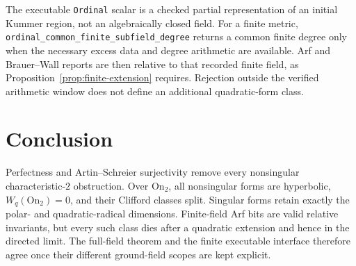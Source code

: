 \documentclass[11pt]{article}
\theoremstyle{definition}
\theoremstyle{remark}
\newcommand{\On}{\mathrm{On}_2}
\begin{document}
The executable \texttt{Ordinal} scalar is a checked partial representation of
an initial Kummer region, not an algebraically closed field.  For a finite
metric, \texttt{ordinal\_common\_finite\_subfield\_degree} returns a common
finite degree only when the necessary excess data and degree arithmetic are
available.  Arf and Brauer--Wall reports are then relative to that recorded
finite field, as Proposition~\ref{prop:finite-extension} requires.  Rejection
outside the verified arithmetic window does not define an additional
quadratic-form class.

\section{Conclusion}

Perfectness and Artin--Schreier surjectivity remove every nonsingular
characteristic-$2$ obstruction.  Over $\On$, all nonsingular forms are
hyperbolic, $W_q(\On)=0$, and their Clifford classes split.  Singular forms
retain exactly the polar- and quadratic-radical dimensions.  Finite-field Arf
bits are valid relative invariants, but every such class dies after a
quadratic extension and hence in the directed limit.  The full-field theorem
and the finite executable interface therefore agree once their different
ground-field scopes are kept explicit.



\end{document}
